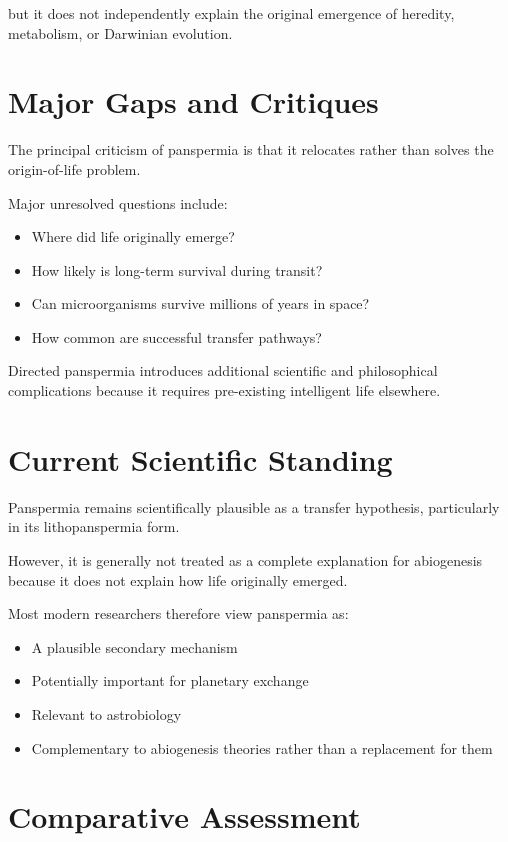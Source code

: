 \documentclass[
  oneside]{book}
\providecommand{\tightlist}{%
  \setlength{\itemsep}{0pt}\setlength{\parskip}{0pt}}
\begin{document}
but it does not independently explain the original emergence of heredity, metabolism, or Darwinian evolution.

\section{Major Gaps and Critiques}\label{major-gaps-and-critiques-7}

The principal criticism of panspermia is that it relocates rather than solves the origin-of-life problem.

Major unresolved questions include:

\begin{itemize}
\tightlist
\item
  Where did life originally emerge?
\item
  How likely is long-term survival during transit?
\item
  Can microorganisms survive millions of years in space?
\item
  How common are successful transfer pathways?
\end{itemize}

Directed panspermia introduces additional scientific and philosophical complications because it requires pre-existing intelligent life elsewhere.

\section{Current Scientific Standing}\label{current-scientific-standing-7}

Panspermia remains scientifically plausible as a transfer hypothesis, particularly in its lithopanspermia form.

However, it is generally not treated as a complete explanation for abiogenesis because it does not explain how life originally emerged.

Most modern researchers therefore view panspermia as:

\begin{itemize}
\tightlist
\item
  A plausible secondary mechanism
\item
  Potentially important for planetary exchange
\item
  Relevant to astrobiology
\item
  Complementary to abiogenesis theories rather than a replacement for them
\end{itemize}

\section{Comparative Assessment}\label{comparative-assessment-7}
\end{document}
